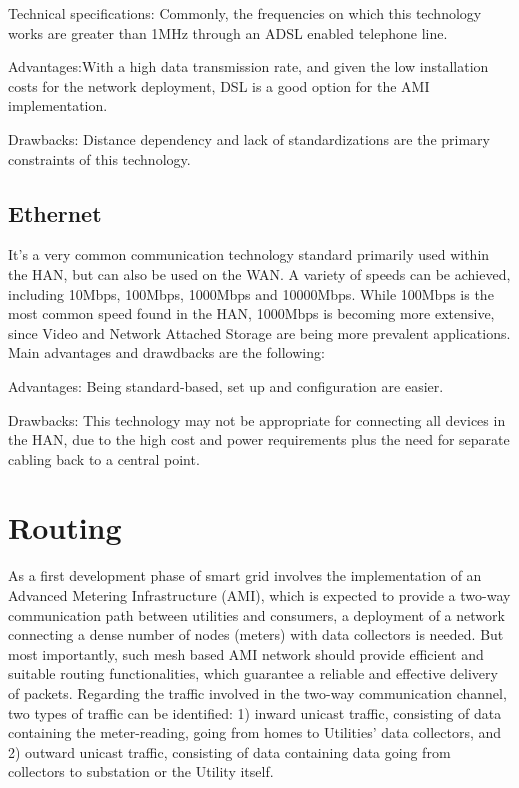 \documentclass[11pt,draftclsnofoot,onecolumn]{IEEEtran}
\begin{document}
Technical specifications: Commonly, the frequencies on which this technology works are greater than 1MHz through an ADSL enabled telephone line. 

Advantages:With a high data transmission rate, and given the low installation costs for the network deployment, DSL is a good option for the AMI implementation.

Drawbacks: Distance dependency and lack of standardizations are the primary constraints of this technology.


\subsection{Ethernet}\label{ethernetl}

It’s a very common communication technology standard primarily used within the HAN, but can also be used on the WAN. A variety of speeds can be achieved, including 10Mbps, 100Mbps, 1000Mbps and 10000Mbps. While 100Mbps is the most common speed found in the HAN, 1000Mbps is becoming more extensive, since Video and Network Attached Storage are being more prevalent applications. Main advantages and drawdbacks are the following:

Advantages: Being standard-based, set up and configuration are easier.

Drawbacks: This technology may not be appropriate for connecting all devices in the HAN, due to the high cost and power requirements plus the need for separate cabling back to a central point.


\section{Routing} \label{routing}

As a first development phase of smart grid involves the implementation of an Advanced Metering Infrastructure (AMI), which is expected to provide a two-way communication path between utilities and consumers, a deployment of a network connecting a dense number of nodes (meters) with data collectors is needed. But most importantly, such mesh based AMI network should provide efficient and suitable routing functionalities, which guarantee a reliable and effective delivery of packets. Regarding the traffic involved in the two-way communication channel, two types of traffic can be identified: 1) inward unicast traffic, consisting of data containing the meter-reading, going from homes to Utilities’ data collectors, and 2) outward unicast traffic, consisting of data containing data going from collectors to substation or the Utility itself. 
\end{document}
